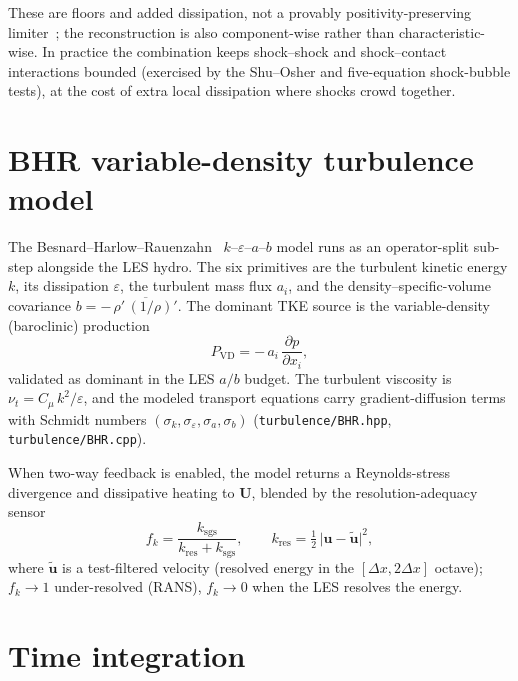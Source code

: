 \documentclass[11pt]{article}
\newcommand{\dpar}[2]{\frac{\partial #1}{\partial #2}}
\newcommand{\uvec}{\mathbf{u}}
\newcommand{\code}[1]{\texttt{#1}}
\begin{document}
These are floors and added dissipation, not a provably positivity-preserving
limiter~\cite{zhang_shu_2010}; the reconstruction is also component-wise rather
than characteristic-wise. In practice the combination keeps shock--shock and
shock--contact interactions bounded (exercised by the Shu--Osher and
five-equation shock-bubble tests), at the cost of extra local dissipation where
shocks crowd together.

\section{BHR variable-density turbulence model}
\label{sec:bhr}

The Besnard--Harlow--Rauenzahn~\cite{besnard_1992} $k$--$\varepsilon$--$a$--$b$ model runs as an
operator-split sub-step alongside the LES hydro. The six primitives are the
turbulent kinetic energy $k$, its dissipation $\varepsilon$, the turbulent mass
flux $a_i$, and the density--specific-volume covariance
$b = -\,\overline{\rho'\,(1/\rho)'}$. The dominant TKE source is the
variable-density (baroclinic) production
\begin{equation}
P_{\mathrm{VD}} = -\,a_i\,\dpar{p}{x_i},
\end{equation}
validated as dominant in the LES $a/b$ budget. The turbulent viscosity is
$\nu_t = C_\mu\,k^2/\varepsilon$, and the modeled transport equations carry
gradient-diffusion terms with Schmidt numbers
$(\sigma_k,\sigma_\varepsilon,\sigma_a,\sigma_b)$
(\code{turbulence/BHR.hpp}, \code{turbulence/BHR.cpp}).

When two-way feedback is enabled, the model returns a Reynolds-stress divergence
and dissipative heating to $\mathbf{U}$, blended by the resolution-adequacy sensor
\begin{equation}
f_k = \frac{k_{\mathrm{sgs}}}{k_{\mathrm{res}} + k_{\mathrm{sgs}}},
\qquad
k_{\mathrm{res}} = \tfrac12\,\big|\uvec - \widetilde{\uvec}\big|^2,
\end{equation}
where $\widetilde{\uvec}$ is a test-filtered velocity (resolved energy in the
$[\Delta x, 2\Delta x]$ octave); $f_k\to1$ under-resolved (RANS), $f_k\to0$ when
the LES resolves the energy.

\section{Time integration}
\label{sec:rk3}
\end{document}
